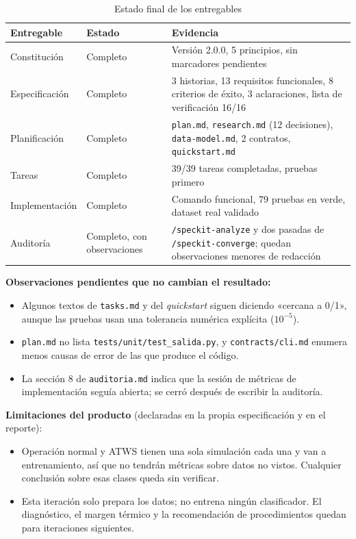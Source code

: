 \documentclass[12pt,a4paper]{article}
\begin{document}
\begin{table}[H]
\centering
\small
{}
\begin{tabular}{@{}P{3.3cm}P{2.6cm}P{9.1cm}@{}}
\toprule
\textbf{Entregable} & \textbf{Estado} & \textbf{Evidencia} \\
\midrule
Constitución & Completo & Versión 2.0.0, 5 principios, sin marcadores pendientes \\
Especificación & Completo & 3 historias, 13 requisitos funcionales, 8 criterios de éxito, 3 aclaraciones, lista de verificación 16/16 \\
Planificación & Completo & \texttt{plan.md}, \texttt{research.md} (12 decisiones), \texttt{data-model.md}, 2 contratos, \texttt{quickstart.md} \\
Tareas & Completo & 39/39 tareas completadas, pruebas primero \\
Implementación & Completo & Comando funcional, 79 pruebas en verde, dataset real validado \\
Auditoría & Completo, con observaciones & \texttt{/speckit-analyze} y dos pasadas de \texttt{/speckit-converge}; quedan observaciones menores de redacción \\
\bottomrule
\end{tabular}
\caption{Estado final de los entregables}
\end{table}

\textbf{Observaciones pendientes que no cambian el resultado:}
\begin{itemize}
  \item Algunos textos de \texttt{tasks.md} y del \textit{quickstart} siguen diciendo «cercana a 0/1», aunque las pruebas usan una tolerancia numérica explícita (\(10^{-5}\)).
  \item \texttt{plan.md} no lista \texttt{tests/unit/test\_salida.py}, y \texttt{contracts/cli.md} enumera menos causas de error de las que produce el código.
  \item La sección 8 de \texttt{auditoria.md} indica que la sesión de métricas de implementación seguía abierta; se cerró después de escribir la auditoría.
\end{itemize}

\textbf{Limitaciones del producto} (declaradas en la propia especificación y en el reporte):
\begin{itemize}
  \item Operación normal y ATWS tienen una sola simulación cada una y van a entrenamiento, así que no tendrán métricas sobre datos no vistos. Cualquier conclusión sobre esas clases queda sin verificar.
  \item Esta iteración solo prepara los datos; no entrena ningún clasificador. El diagnóstico, el margen térmico y la recomendación de procedimientos quedan para iteraciones siguientes.
\end{itemize}
\end{document}
